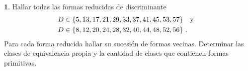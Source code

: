 \theoremstyle{definition}
\newtheorem{ejerIndefinidas}{\ejername}[section]


\begin{ejerIndefinidas}
	Hallar todas las formas reducidas de discriminante
	\begin{displaymath}
		\begin{aligned}
			D & \in\{5,13,17,21,29,33,37,41,45,53,57\}\quad\text{y}\quad \\
			D & \in\{8,12,20,24,28,32,40,44,48,52,56\}
			\text{ .}
		\end{aligned}
	\end{displaymath}
	Para cada forma reducida hallar su sucesi\'on de formas vecinas.
	Determinar las clases de equivalencia propia y la cantidad de
	clases que contienen formas primitivas.
\end{ejerIndefinidas}

